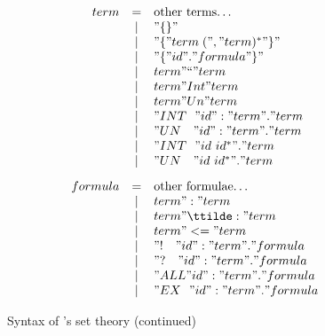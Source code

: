 \begin{figure}
\dquotes
\[\begin{array}{rcl}
    term & = & \hbox{other terms\ldots} \\
         & | & "\{\}" \\
         & | & "\{ " term\; ("," term)^* " \}" \\
         & | & "\{ " id " . " formula " \}" \\
         & | & term " `` " term \\
         & | & term " Int " term \\
         & | & term " Un " term \\
         & | & "INT~~"  id ":" term " . " term \\
         & | & "UN~~~"  id ":" term " . " term \\
         & | & "INT~~"  id~id^* " . " term \\
         & | & "UN~~~"  id~id^* " . " term \\[2ex]
 formula & = & \hbox{other formulae\ldots} \\
         & | & term " : " term \\
         & | & term " \ttilde: " term \\
         & | & term " <= " term \\
         & | & "!~~~" id ":" term " . " formula \\
         & | & "?~~~" id ":" term " . " formula \\
         & | & "ALL " id ":" term " . " formula \\
         & | & "EX~~" id ":" term " . " formula
  \end{array}
\]
\caption{Syntax of \HOL's set theory (continued)} \label{hol-set-syntax2}
\end{figure} 


